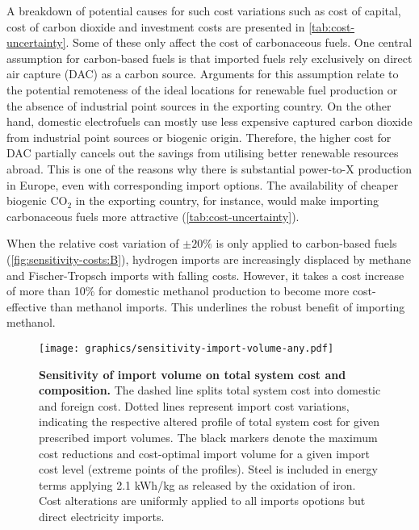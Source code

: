 \documentclass[5p,10pt]{elsarticle}
\begin{document}
A breakdown of potential causes for such cost variations such as cost of
capital, cost of carbon dioxide and investment costs are presented in
\cref{tab:cost-uncertainty}. Some of these only affect the cost of
carbonaceous fuels. One central assumption for carbon-based fuels is that
imported fuels rely exclusively on direct air capture (DAC) as a carbon source.
Arguments for this assumption relate to the potential remoteness of the ideal
locations for renewable fuel production or the absence of industrial point
sources in the exporting country. On the other hand, domestic electrofuels can
mostly use less expensive captured carbon dioxide from industrial point sources
or biogenic origin. Therefore, the higher cost for DAC partially cancels out the
savings from utilising better renewable resources abroad. This is one of the
reasons why there is substantial power-to-X production in Europe, even with
corresponding import options. The availability of cheaper biogenic CO$_2$ in the
exporting country, for instance, would make importing carbonaceous fuels more
attractive (\cref{tab:cost-uncertainty}).

When the relative cost variation of $\pm 20\%$ is only applied to carbon-based
fuels (\cref{fig:sensitivity-costs:B}), hydrogen imports are increasingly
displaced by methane and Fischer-Tropsch imports with falling costs. However, it
takes a cost increase of more than 10\% for domestic methanol production to
become more cost-effective than methanol imports. This underlines the robust
benefit of importing methanol.


\begin{figure*}
    \texttt{[image: graphics/sensitivity-import-volume-any.pdf]}
    \caption{\textbf{Sensitivity of import volume on total system cost and composition.}
        The dashed line splits total system cost into domestic and foreign cost.
        Dotted lines represent import cost variations, indicating the respective
        altered profile of total system cost for given prescribed import
        volumes. The black markers denote the maximum cost reductions and
        cost-optimal import volume for a given import cost level (extreme points
        of the profiles). Steel is included in energy terms applying 2.1 kWh/kg
        as released by the oxidation of iron. Cost alterations are uniformly
        applied to all imports opotions but direct electricity imports. }
    \label{fig:sensitivity-volume}
\end{figure*}
\end{document}
